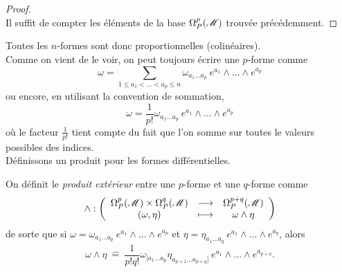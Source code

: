 \documentclass[a4paper,11pt]{report}
\begin{document}
            \begin{proof}${}$\\
                 Il suffit de compter les éléments de la base $\Omega_P^p(\mathscr{M})$ trouvée précédemment.
            \end{proof}
            
            Toutes les $n$-formes sont donc proportionnelles (colinéaires).\\
            
            Comme on vient de le voir, on peut toujours écrire une $p$-forme comme
            \begin{equation}
                \omega = \sum_{1\leq a_1<\dots<a_p\leq n} \omega_{a_1\dots a_p}~e^{a_1}\wedge\dots \wedge e^{a_p}
            \end{equation}
            ou encore, en utilisant la convention de sommation,
            \begin{equation}
                \omega = \frac{1}{p!} \omega_{a_1\dots a_p}~e^{a_1}\wedge\dots \wedge e^{a_p}
            \end{equation}
            où le facteur $\frac{1}{p!}$ tient compte du fait que l'on somme sur toutes le valeurs possibles des indices.\\
            
            Définissons un produit pour les formes différentielles.
            
            \begin{definition}
                On définit le \textit{produit extérieur} entre une $p$-forme et une $q$-forme comme
                \begin{equation}
                \wedge:\left(
                \begin{array}{ccc}
                    \Omega_P^p(\mathscr{M})\times \Omega_P^q(\mathscr{M}) & \longrightarrow & \Omega_P^{p+q}(\mathscr{M}) \\
                    (\omega,\eta) & \longmapsto & \omega\wedge\eta
                \end{array}
                \right)
                \end{equation}
                de sorte que si $\omega = \omega_{a_1\dots a_p}~e^{a_1}\wedge \dots\wedge e^{a_{p}}$ et $\eta = \eta_{a_1\dots a_q}~e^{a_1}\wedge \dots\wedge e^{a_{q}}$, alors
                \begin{equation}
                    \omega\wedge\eta ~\hat{=}~ \frac{1}{p!q!}\omega_{[a_1\dots a_p}\eta_{a_{p+1}\dots a_{p+q}]}~e^{a_1}\wedge \dots\wedge e^{a_{p+q}}.
                \end{equation}
            \end{definition}
            
\end{document}
